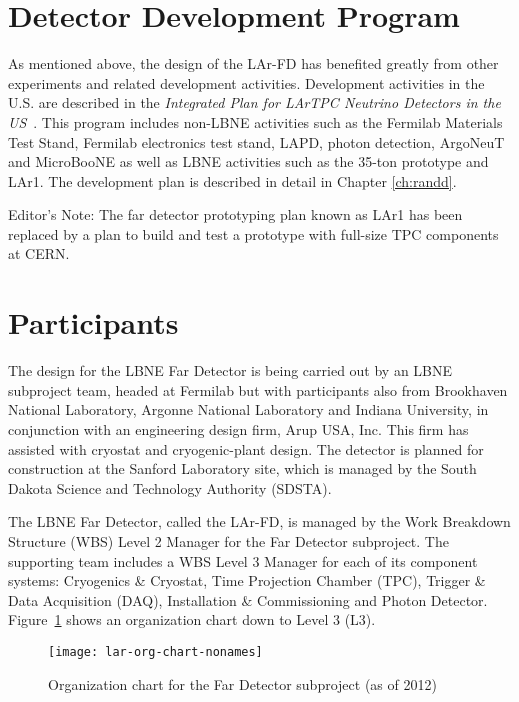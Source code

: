 \section{Detector Development Program}

As mentioned above, the design of the LAr-FD has benefited greatly from other experiments and related development activities. Development activities in the U.S. are described in the  {\em Integrated Plan for LArTPC Neutrino Detectors in the US}~\cite{IP}. This program includes non-LBNE activities such as the Fermilab Materials Test Stand, Fermilab electronics test stand, LAPD, photon detection, ArgoNeuT and MicroBooNE as well as LBNE activities such as the 35-ton prototype and LAr1. The development plan is described in detail in Chapter \ref{ch:randd}.


\begin{editornote}
  Editor's Note: The far detector prototyping plan known as LAr1 has been replaced by a plan to build and test a prototype with full-size TPC components at CERN.
\end{editornote}


\section{Participants}

The design for the LBNE Far Detector is being carried out by an LBNE subproject team, headed at Fermilab  but with participants also from Brookhaven National Laboratory, Argonne National Laboratory and Indiana  University, in conjunction with an engineering design firm, Arup USA, Inc.  This firm has assisted with cryostat and cryogenic-plant design.  The detector is planned for construction at the  Sanford Laboratory site, which is managed by the South Dakota Science and Technology Authority  (SDSTA).

The LBNE Far Detector, called the LAr-FD, is managed by the Work Breakdown Structure (WBS)  Level 2 Manager for the Far Detector subproject. The supporting team includes a WBS Level 3  Manager for each of its component systems: Cryogenics \& Cryostat, Time Projection Chamber (TPC),  Trigger \& Data Acquisition (DAQ), Installation \& Commissioning and Photon Detector.  Figure~\ref{fig:lar-org} shows an organization chart down to Level 3 (L3).

\begin{figure}
\begin{center}
\texttt{[image: lar-org-chart-nonames]}
\caption[Organization chart for the Far Detector subproject]{\label{fig:lar-org} Organization chart for the Far Detector subproject (as of 2012)}
\end{center}
\end{figure}

